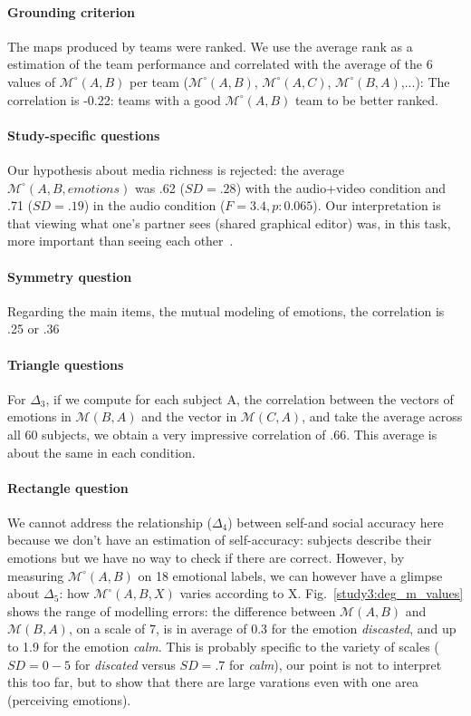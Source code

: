 \documentclass[twocolumn]{article}
\newcommand{\gmodel}[2]{{$\mathcal{M}(#1, #2)$}}
\newcommand{\Model}[3]{{$\mathcal{M}^{\circ}(#1, #2, #3)$}}
\newcommand{\gModel}[2]{{$\mathcal{M}^{\circ}(#1, #2)$}}
\begin{document}
\paragraph{Grounding criterion} The maps produced by teams were ranked. We use
the average rank as a estimation of the team performance and correlated with the
average of the 6 values of \gModel{A}{B} per team (\gModel{A}{B}, \gModel{A}{C},
\gModel{B}{A},...): The correlation is -0.22: teams with a good \gModel{A}{B}
team to be better ranked. 

\paragraph{Study-specific questions} Our hypothesis about media richness is
rejected: the average \Model{A}{B}{emotions} was .62 ($SD = .28$) with the
audio+video condition and .71 ($SD = .19$) in the audio condition ($F=3.4, p:
0.065$). Our interpretation is that viewing what one's partner sees (shared
graphical editor) was, in this task, more important than seeing each
other~\cite{gaver1993one}.

\paragraph{Symmetry question} Regarding the main items, the mutual modeling of
emotions, the correlation is .25 or .36  

\paragraph{Triangle questions}  For $\Delta_3$, if we
compute for each subject A, the correlation between the vectors of emotions in
\gmodel{B}{A} and the vector in \gmodel{C}{A}, and take the average across all
60 subjects, we obtain a very impressive correlation of .66. This average is
about the same in each condition.

\paragraph{Rectangle question} We cannot address the relationship ($\Delta_4$)
between self-and social accuracy here because we don't have an estimation of
self-accuracy: subjects describe their emotions but we have no way to check if
there are correct. However, by measuring \gModel{A}{B} on  18 emotional labels,
we can however have a glimpse about $\Delta_5$: how \Model{A}{B}{X} varies
according to X.  Fig.~\ref{study3:deg_m_values} shows the range of modelling
errors: the difference between \gmodel{A}{B} and \gmodel{B}{A}, on a scale of 7,
is in average of 0.3 for the emotion \emph{discasted}, and up to 1.9 for the
emotion \emph{calm}. This is probably specific to the variety of scales  ($SD=
0-5$ for \emph{discated} versus $SD=.7$ for \emph{calm}), our point is not to
interpret this too far, but to show that there are large varations even with one
area  (perceiving emotions). 
\end{document}
